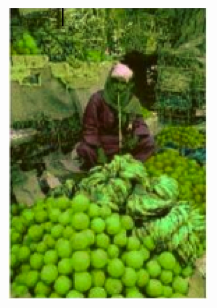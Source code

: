 \documentclass[10pt,twocolumn,letterpaper]{article}
\begin{document}
\begin{figure}[h]
\begin{subfigure}{0.23\textwidth}
    \includegraphics[width=\textwidth]{fruits3.png}
    \caption{}
  \end{subfigure}
  \begin{subfigure}{0.23\textwidth}

\end{subfigure}
\end{figure}
\end{document}
